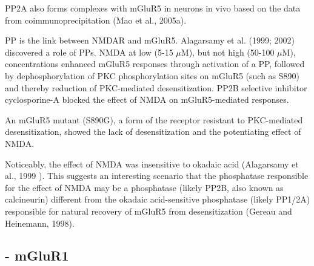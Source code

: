 \begin{enumerate}
PP2A also forms complexes with mGluR5 in neurons in vivo
 based on the data from coimmunoprecipitation (Mao et al., 2005a).

PP is the link between NMDAR and mGluR5.
Alagarsamy et al. (1999; 2002) discovered a role of PPs. NMDA at low (5-15 $\mu$M),
but not high (50-100 $\mu$M), concentrations enhanced mGluR5 responses through
activation of a PP, followed by dephosphorylation of PKC phosphorylation sites
on mGluR5 (such as S890) and thereby reduction of PKC-mediated desensitization.
PP2B selective inhibitor cyclosporine-A blocked the effect of NMDA on
mGluR5-mediated responses.
  
An mGluR5 mutant (S890G), a form of the receptor resistant
to PKC-mediated desensitization, showed the lack of desensitization and the potentiating effect
of NMDA. 

Noticeably, the effect of NMDA was insensitive to okadaic acid (Alagarsamy et
al., 1999 ). This suggests an interesting scenario that the phosphatase
responsible for the effect of NMDA may be a phosphatase (likely PP2B, also known
as calcineurin) different from the okadaic acid-sensitive phosphatase (likely
PP1/2A) responsible for natural recovery of mGluR5 from desensitization (Gereau
and Heinemann, 1998).
  
\end{enumerate}



\subsection{- mGluR1}
\label{sec:mGluR1}


